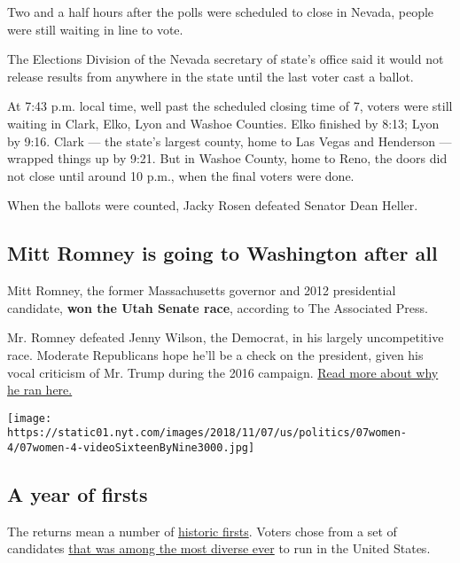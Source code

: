 Two and a half hours after the polls were scheduled to close in Nevada,
people were still waiting in line to vote.

The Elections Division of the Nevada secretary of state's office said it
would not release results from anywhere in the state until the last
voter cast a ballot.

At 7:43 p.m. local time, well past the scheduled closing time of 7,
voters were still waiting in Clark, Elko, Lyon and Washoe Counties. Elko
finished by 8:13; Lyon by 9:16. Clark --- the state's largest county,
home to Las Vegas and Henderson --- wrapped things up by 9:21. But in
Washoe County, home to Reno, the doors did not close until around 10
p.m., when the final voters were done.

When the ballots were counted, Jacky Rosen defeated Senator Dean Heller.

\hypertarget{mitt-romney-is-going-to-washington-after-all}{%
\subsection{Mitt Romney is going to Washington after
all}\label{mitt-romney-is-going-to-washington-after-all}}

Mitt Romney, the former Massachusetts governor and 2012 presidential
candidate, \textbf{won the Utah Senate race}, according to The
Associated Press.

Mr. Romney defeated Jenny Wilson, the Democrat, in his largely
uncompetitive race. Moderate Republicans hope he'll be a check on the
president, given his vocal criticism of Mr. Trump during the 2016
campaign.
\href{https://www.nytimes.com/2018/06/10/us/politics/mitt-romney-utah.html}{Read
more about why he ran here.}

\texttt{[image: https://static01.nyt.com/images/2018/11/07/us/politics/07women-4/07women-4-videoSixteenByNine3000.jpg]}

\hypertarget{a-year-of-firsts}{%
\subsection{A year of firsts}\label{a-year-of-firsts}}

The returns mean a number of
\href{https://www.nytimes.com/2018/11/07/us/politics/election-history-firsts-blackburn-pressley.html}{historic
firsts}. Voters chose from a set of candidates
\href{https://www.nytimes.com/interactive/2018/10/31/us/politics/midterm-election-candidates-diversity.html}{that
was among the most diverse ever} to run in the United States.

